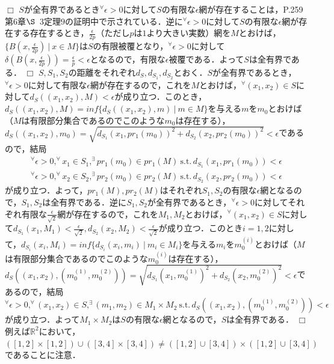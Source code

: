 ﻿\documentclass[11pt,a4paper]{jsarticle}
\newcommand{\st}{\mathrm{s.t.}\,}  %
\def\qed{\hfill $\Box$}
\begin{document}
\qed
%
\prob
$S$が全有界であるとき$^\forall\epsilon>0$に対して$S$の有限な$\epsilon$網が存在することは，P.259第$6$章$\S${\ }$3$定理$9$の証明中で示されている．逆に$^\forall\epsilon>0$に対して$S$の有限な$\epsilon$網が存在する存在するとき，$\frac{\epsilon}{2p}$（ただし$p$は$1$より大きい実数）網を$M$とおけば，$\{B(x,\frac{\epsilon}{2p}){\ }|{\ }x \in M\}$は$S$の有限被覆となり，$^\forall\epsilon>0$に対して$\delta(B(x,\frac{\epsilon}{2p}))=\frac{\epsilon}{p}<\epsilon$となるので，有限な$\epsilon$被覆である．よって$S$は全有界である．
\qed
%
\prob
$S,S_1,S_2$の距離をそれぞれ$d_S,d_{S_1},d_{S_2}$とおく．$S$が全有界であるとき，$^\forall\epsilon>0$に対して有限な$\epsilon$網が存在するので，これを$M$とおけば，$^\forall (x_1,x_2) \in S$に対して$d_S((x_1,x_2),M)<\epsilon$が成り立つ．このとき，$d_S((x_1,x_2),M)=inf\{d_S((x_1,x_2),m){\ }|{\ }m \in M\}$を与える$m$を$m_0$とおけば（$M$は有限部分集合であるのでこのような$m_0$は存在する），$d_S((x_1,x_2),m_0)=\sqrt{d_{S_1}(x_1,pr_1(m_0))^2+d_{S_2}(x_2,pr_2(m_0))^2}<\epsilon$であるので，結局
\begin{eqnarray*}
^\forall\epsilon>0, ^\forall x_1 \in S_1, ^\exists pr_1(m_0) \in pr_1(M) {\ } \st d_{S_1}(x_1,pr_1(m_0))<\epsilon\\
^\forall\epsilon>0, ^\forall x_2 \in S_2, ^\exists pr_2(m_0) \in pr_2(M) {\ } \st d_{S_2}(x_2,pr_2(m_0))<\epsilon
\end{eqnarray*}
が成り立つ．よって，$pr_1(M),pr_2(M)$はそれぞれ$S_1,S_2$の有限な$\epsilon$網となるので，$S_1,S_2$は全有界である．逆に$S_1,S_2$が全有界であるとき，$^\forall\epsilon>0$に対してそれぞれ有限な$\frac{\epsilon}{\sqrt{2}}$網が存在するので，これを$M_1,M_2$とおけば，$^\forall (x_1,x_2) \in S$に対して$d_{S_1}(x_1,M_1)<\frac{\epsilon}{\sqrt{2}},d_{S_2}(x_2,M_2)<\frac{\epsilon}{\sqrt{2}}$が成り立つ．このとき$i=1,2$に対して，$d_{S_i}(x_i,M_i)=inf\{d_{S_i}(x_i,m_i){\ }|{\ }m_i \in M_i\}$を与える$m_i$を$m_0^{(i)}$とおけば（$M$は有限部分集合であるのでこのような$m_0^{(i)}$は存在する），$d_S((x_1,x_2),(m_0^{(1)},m_0^{(2)}))=\sqrt{d_{S_1}(x_1,m_0^{(1)})^2+d_{S_2}(x_2,m_0^{(2)})^2}<\epsilon$であるので，結局
\begin{equation*}
^\forall\epsilon>0, ^\forall (x_1,x_2) \in S, ^\exists (m_1,m_2) \in M_1 \times M_2 {\ } \st d_S((x_1,x_2),(m_0^{(1)},m_0^{(2)}))<\epsilon
\end{equation*}
が成り立つ．よって$M_1 \times M_2$は$S$の有限な$\epsilon$網となるので，$S$は全有界である．
\qed
\supple
例えば$\mathbb{R}^2$において，$([1,2]\times[1,2]) \cup ([3,4]\times[3,4]) \neq ([1,2] \cup [3,4]) \times ([1,2] \cup [3,4])$であることに注意．
%
%
\end{document}
